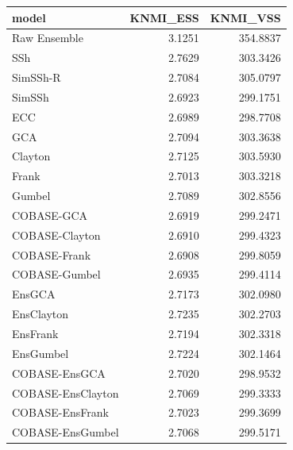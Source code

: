 \begin{table}[ht]
\centering
\begin{tabular}{lrr}
  \hline
model & KNMI\_ESS & KNMI\_VSS \\ 
  \hline
Raw Ensemble & 3.1251 & 354.8837 \\ 
  SSh & 2.7629 & 303.3426 \\ 
  SimSSh-R & 2.7084 & 305.0797 \\ 
  SimSSh & 2.6923 & 299.1751 \\ 
  ECC & 2.6989 & 298.7708 \\ 
  GCA & 2.7094 & 303.3638 \\ 
  Clayton & 2.7125 & 303.5930 \\ 
  Frank & 2.7013 & 303.3218 \\ 
  Gumbel & 2.7089 & 302.8556 \\ 
  COBASE-GCA & 2.6919 & 299.2471 \\ 
  COBASE-Clayton & 2.6910 & 299.4323 \\ 
  COBASE-Frank & 2.6908 & 299.8059 \\ 
  COBASE-Gumbel & 2.6935 & 299.4114 \\ 
  EnsGCA & 2.7173 & 302.0980 \\ 
  EnsClayton & 2.7235 & 302.2703 \\ 
  EnsFrank & 2.7194 & 302.3318 \\ 
  EnsGumbel & 2.7224 & 302.1464 \\ 
  COBASE-EnsGCA & 2.7020 & 298.9532 \\ 
  COBASE-EnsClayton & 2.7069 & 299.3333 \\ 
  COBASE-EnsFrank & 2.7023 & 299.3699 \\ 
  COBASE-EnsGumbel & 2.7068 & 299.5171 \\ 
   \hline
\end{tabular}
\end{table}
